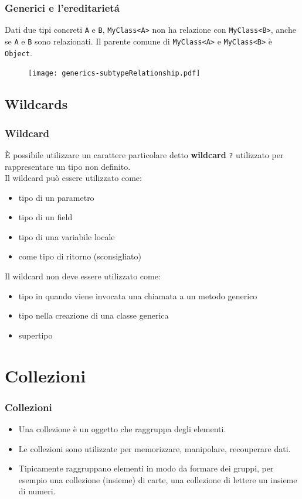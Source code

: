 \documentclass{beamer}
\begin{document}
\begin{frame}[fragile]
\frametitle{Generici e l'ereditariet\'a}
\begin{framed}
Dati due tipi concreti \texttt{A} e \texttt{B}, \texttt{MyClass<A>} non ha relazione con \texttt{MyClass<B>}, anche se \texttt{A} e \texttt{B} sono relazionati. Il parente comune di  \texttt{MyClass<A>} e \texttt{MyClass<B>} \`e \texttt{Object}.
\end{framed}
\begin{figure}[h!]
  \centering
    \texttt{[image: generics-subtypeRelationship.pdf]}
    \label{Fig:collections}
\end{figure}

\end{frame}

\subsection{Wildcards}
\begin{frame}[fragile]
\frametitle{Wildcard}
\`E possibile utilizzare un carattere particolare detto \textbf{wildcard} \texttt{?} utilizzato per rappresentare un tipo non definito.\\
Il wildcard pu\`o essere utilizzato  come:
\begin{itemize}
\item tipo di un parametro
\item tipo di un field
\item tipo di una variabile locale 
\item come tipo di ritorno (sconsigliato)
\end{itemize}
Il wildcard non deve essere utilizzato come:
\begin{itemize}
\item tipo in quando viene invocata una chiamata a un metodo generico
\item tipo nella creazione di una classe generica
\item supertipo
\end{itemize}
\end{frame}





\section{Collezioni}
\begin{frame}[fragile]
\frametitle{Collezioni}
\begin{framed}
\begin{itemize}
\item Una collezione \`e un oggetto che raggruppa degli elementi.
\item Le collezioni sono utilizzate per memorizzare, manipolare, recouperare dati.
\item Tipicamente raggruppano elementi in modo da formare dei gruppi, per esempio una collezione (insieme) di carte, una collezione di lettere un insieme di numeri. 
\end{itemize}
\end{framed}
\end{frame}
\end{document}
